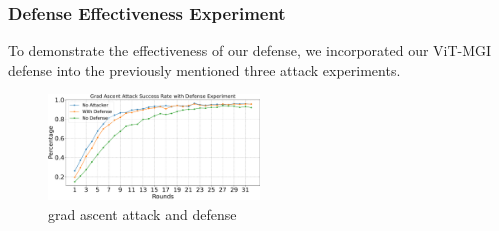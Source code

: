 \documentclass[conference]{IEEEtran}
\def\figGradAscentAttackDefense{0.5\textwidth}
\begin{document}


\subsubsection{\textbf{Defense Effectiveness Experiment}}
\label{exp:defenseEffectiveness}


To demonstrate the effectiveness of our defense, we incorporated our ViT-MGI defense into the previously mentioned three attack experiments.

\begin{figure}[htbp]
    \centerline{\includegraphics[width=\figGradAscentAttackDefense]{pics/004-gradAttack-attackRate=1-withDefense.pdf}}
    \caption{grad ascent attack and defense}
    \label{fig:gradAscentDefense}
\end{figure}

\end{document}
